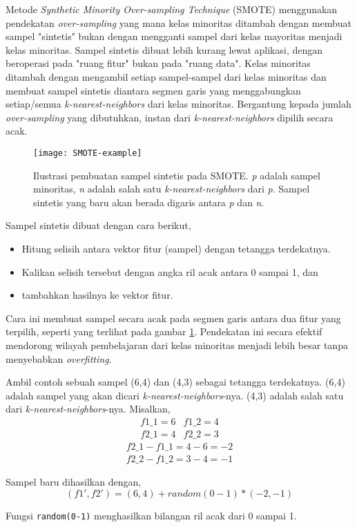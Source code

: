 Metode \textit{Synthetic Minority Over-sampling Technique} (SMOTE)
\cite{chawla2002smote} menggunakan pendekatan \textit{over-sampling} yang mana
kelas minoritas ditambah dengan membuat sampel "sintetis" bukan dengan
mengganti sampel dari kelas mayoritas menjadi kelas minoritas.
Sampel sintetis dibuat lebih kurang lewat aplikasi, dengan beroperasi pada
"ruang fitur" bukan pada "ruang data".
Kelas minoritas ditambah dengan mengambil setiap sampel-sampel dari kelas
minoritas dan membuat sampel sintetis diantara segmen garis yang menggabungkan
setiap/semua \textit{k-nearest-neighbors} dari kelas minoritas.
Bergantung kepada jumlah \textit{over-sampling} yang dibutuhkan, instan dari
\textit{k-nearest-neighbors} dipilih secara acak.

\begin{figure}[b]
	\centering
	\texttt{[image: SMOTE-example]}
	\caption{Ilustrasi pembuatan sampel sintetis pada SMOTE.
\textit{p} adalah sampel minoritas, \textit{n} adalah salah satu
\textit{k-nearest-neighbors} dari \textit{p}.
Sampel sintetis yang baru akan berada digaris antara \textit{p} dan \textit{n}.
	}
	\label{fig:smote}
\end{figure}

Sampel sintetis dibuat dengan cara berikut,
\begin{itemize}
	\item Hitung selisih antara vektor fitur (sampel) dengan tetangga
	terdekatnya.
	\item Kalikan selisih tersebut dengan angka ril acak antara 0 sampai 1,
	dan
	\item tambahkan hasilnya ke vektor fitur.
\end{itemize}

Cara ini membuat sampel secara acak pada segmen garis antara dua fitur yang
terpilih, seperti yang terlihat pada gambar \ref{fig:smote}.
Pendekatan ini secara efektif mendorong wilayah pembelajaran dari kelas
minoritas menjadi lebih besar tanpa menyebabkan \textit{overfitting}.

Ambil contoh sebuah sampel (6,4) dan (4,3) sebagai tetangga terdekatnya.
(6,4) adalah sampel yang akan dicari \textit{k-nearest-neighbors}-nya.
(4,3) adalah salah satu dari \textit{k-nearest-neighbors}-nya.
Misalkan,
\[
\begin{matrix}
f1\_1 = 6 & f1\_2 = 4 \\
f2\_1 = 4 & f2\_2 = 3
\end{matrix}
\]
\[
\begin{matrix}
f2\_1 - f1\_1 = 4 - 6 = -2 \\
f2\_2 - f1\_2 = 3 - 4 = -1
\end{matrix}
\]

Sampel baru dihasilkan dengan,
\[
(f1', f2') = (6,4) + random(0-1) * (-2,-1)
\]

Fungsi \texttt{random(0-1)} menghasilkan bilangan ril acak dari 0 sampai 1.
